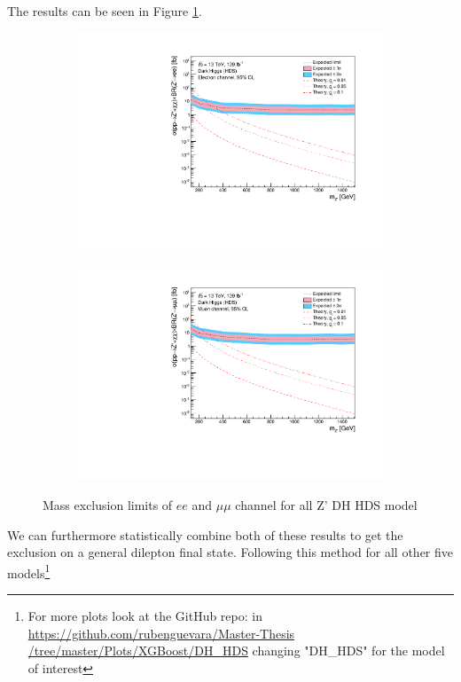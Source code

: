 \documentclass[12pt, a4paper]{book}
\begin{document}
The results can be seen in Figure \ref{fig:DH_HDS_exclusion_ee_uu}.
\clearpage
\begin{figure}[!ht]
	\centering
   \begin{subfigure}[b]{0.49\textwidth}
      \centering
      \includegraphics[width=1\textwidth]{Limits/DH_HDS/mass_exclusion_ee.pdf}
      \end{subfigure}
   \hfill
   \begin{subfigure}[b]{0.49\textwidth}
      \centering
      \includegraphics[width=1\textwidth]{Limits/DH_HDS/mass_exclusion_uu.pdf}
      \end{subfigure}
   \caption{Mass exclusion limits of $ee$ and $\mu\mu$ channel for all Z' DH HDS model}\label{fig:DH_HDS_exclusion_ee_uu}
\end{figure}
\noindent We can furthermore statistically combine both of these results to get the exclusion on a general dilepton final state. Following this method for all other five models\footnote{For more plots look at the GitHub repo: in \href{https://github.com/rubenguevara/Master-Thesis/tree/master/Plots/XGBoost/DH_HDS}{https://github.com/rubenguevara/Master-Thesis\\/tree/master/Plots/XGBoost/DH\_HDS} changing "DH\_HDS" for the model of interest} 
\end{document}
